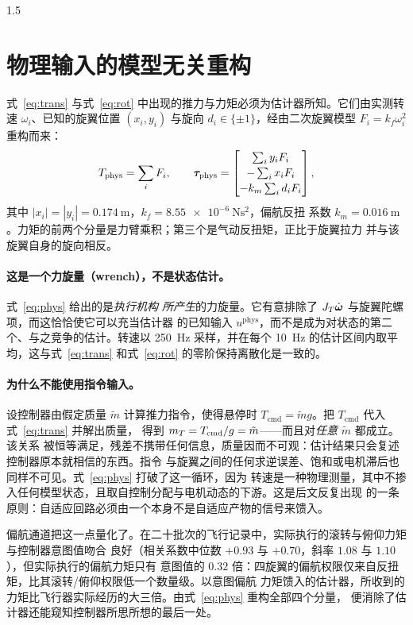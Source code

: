 \begin{spacing}{1.5}
\section{物理输入的模型无关重构}\label{sec:model:phys}

式~\eqref{eq:trans} 与式~\eqref{eq:rot} 中出现的推力与力矩必须为估计器所知。它们由实测转速
$\omega_i$、已知的旋翼位置 $(x_i,y_i)$ 与旋向 $d_i\in\{\pm1\}$，经由二次旋翼模型
$F_i = k_f \omega_i^2$ 重构而来：
\begin{equation}
T_{\mathrm{phys}} = \sum_i F_i, \qquad
\bm{\tau}_{\mathrm{phys}} =
\begin{bmatrix}
\sum_i y_i F_i \\[2pt]
-\sum_i x_i F_i \\[2pt]
-k_m \sum_i d_i F_i
\end{bmatrix},
\label{eq:phys}
\end{equation}
其中 $|x_i|=|y_i|=\SI{0.174}{\meter}$，$k_f=\SI{8.55e-6}{\newton\second\squared}$，偏航反扭
系数 $k_m=\SI{0.016}{\meter}$。力矩的前两个分量是力臂乘积；第三个是气动反扭矩，正比于旋翼拉力
并与该旋翼自身的旋向相反。

\paragraph{这是一个力旋量（wrench），不是状态估计。}式~\eqref{eq:phys} 给出的是\emph{执行机构
所产生}的力旋量。它有意排除了 $J_T\dot{\bm\omega}$ 与旋翼陀螺项，而这恰恰使它可以充当估计器
的已知输入 $u^{\mathrm{phys}}$，而不是成为对状态的第二个、与之竞争的估计。转速以
\SI{250}{\hertz} 采样，并在每个 \SI{10}{\hertz} 的估计区间内取平均，这与式~\eqref{eq:trans}
和式~\eqref{eq:rot} 的零阶保持离散化是一致的。

\paragraph{为什么不能使用指令输入。}设控制器由假定质量 $\tilde{m}$ 计算推力指令，使得悬停时
$T_{\mathrm{cmd}} = \tilde{m} g$。把 $T_{\mathrm{cmd}}$ 代入式~\eqref{eq:trans} 并解出质量，
得到 $m_T = T_{\mathrm{cmd}} / g = \tilde{m}$——而且对\emph{任意} $\tilde{m}$ 都成立。该关系
被恒等满足，残差不携带任何信息，质量因而不可观：估计结果只会复述控制器原本就相信的东西。指令
与旋翼之间的任何求逆误差、饱和或电机滞后也同样不可见。式~\eqref{eq:phys} 打破了这一循环，因为
转速是一种物理测量，其中不掺入任何模型状态，且取自控制分配与电机动态的下游。这是后文反复出现
的一条原则：自适应回路必须由一个本身不是自适应产物的信号来馈入。

偏航通道把这一点量化了。在二十批次的飞行记录中，实际执行的滚转与俯仰力矩与控制器意图值吻合
良好（相关系数中位数 $+0.93$ 与 $+0.70$，斜率 $1.08$ 与 $1.10$），但实际执行的偏航力矩只有
意图值的 $0.32$ 倍：四旋翼的偏航权限仅来自反扭矩，比其滚转/俯仰权限低一个数量级。以意图偏航
力矩馈入的估计器，所收到的力矩比飞行器实际经历的大三倍。由式~\eqref{eq:phys} 重构全部四个分量，
便消除了估计器还能窥知控制器所思所想的最后一处。


\end{spacing}
